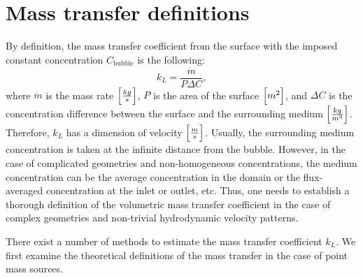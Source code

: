 \documentclass{article}
\newcommand{\beq}{\begin{equation}}
\newcommand{\feq}{\end{equation}}
\newcommand{\cbubble}{C_{\mathrm{bubble}}}
\begin{document}
\section{Mass transfer definitions}
By definition, the mass transfer coefficient from the surface with the imposed constant
concentration $\cbubble$ is the following:
\beq
\label{eq:main:definition}
k_L=\frac{\dot{m}}{P \Delta C},
\feq
where $\dot{m}$ is the mass rate $\Bigl[\frac{kg}{s}\Bigr]$, $P$ is the area of the surface
$\Bigl[m^2\Bigr]$, and $\Delta C$ is the concentration difference between the surface and the surrounding medium
$\Bigl[\frac{kg}{m^3}\Bigr]$. Therefore, $k_L$ has a dimension of velocity
$\Bigl[\frac{m}{s}\Bigr]$. Usually, the surrounding medium concentration is taken at the infinite distance
from the bubble. However, in the case of complicated geometries and non-homogeneous concentrations, 
the medium concentration can be the average concentration in the domain or the flux-averaged
concentration at the inlet or outlet, etc. Thus, one needs to establish a thorough definition of the volumetric
mass transfer coefficient in the case of complex geometries and non-trivial hydrodynamic velocity patterns.

There exist a number of methods to estimate the mass transfer coefficient $k_L$. We first examine the
theoretical definitions of the mass transfer in the case of point mass sources.
\end{document}
